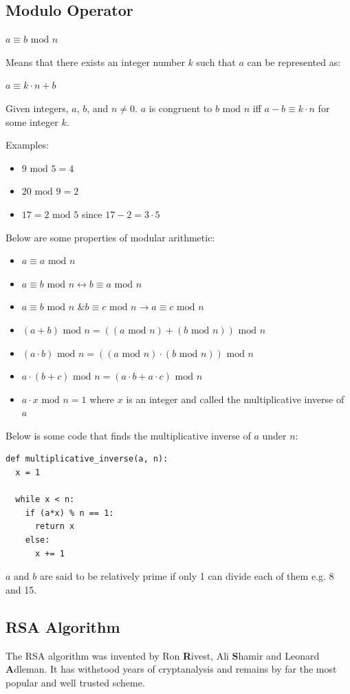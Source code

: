 \documentclass{article}
\newcommand{\Mod}[1]{\text{ mod }#1}
\begin{document}
\subsection{Modulo Operator}
\begin{center}
	$a \equiv b \Mod n$
\end{center}
Means that there exists an integer number $k$ such that $a$ can be represented as:
\begin{center}
	$a \equiv k \cdot n + b$
\end{center}
Given integers, $a$, $b$, and $n \neq 0$. $a$ is congruent to $b \Mod n$ iff $a-b \equiv k\cdot n$ for some integer $k$.

Examples:
\begin{itemize}
	\item $9 \Mod 5 = 4$
	\item $20 \Mod 9 = 2$
	\item $17 = 2 \Mod 5$ since $17-2 = 3 \cdot 5$
\end{itemize}
Below are some properties of modular arithmetic:
\begin{itemize}
	\item $a \equiv a \Mod n$
	\item $a \equiv b \Mod n \leftrightarrow b \equiv a \Mod n$
	\item $a \equiv b \Mod n \text{ \& } b \equiv c \Mod n \rightarrow a \equiv c \Mod n$
	\item $(a + b) \Mod n = ((a \Mod n) + (b \Mod n)) \Mod n$
	\item $(a \cdot b) \Mod n = ((a \Mod n) \cdot (b \Mod n)) \Mod n$
	\item $a \cdot (b + c) \Mod n = (a \cdot b + a \cdot c) \Mod n$
	\item $a \cdot x \Mod n = 1$ where $x$ is an integer and called the multiplicative inverse of $a$
\end{itemize}
Below is some code that finds the multiplicative inverse of $a$ under $n$:
\begin{lstlisting}
def multiplicative_inverse(a, n):
  x = 1

  while x < n:
    if (a*x) % n == 1:
      return x
    else:
      x += 1
\end{lstlisting}
$a$ and $b$ are said to be relatively prime if only 1 can divide each of them e.g. 8 and 15.
\subsection{RSA Algorithm}
The RSA algorithm was invented by Ron \textbf{R}ivest, Ali \textbf{S}hamir and Leonard \textbf{A}dleman. It has withstood years of cryptanalysis and remains by far the most popular and well trusted scheme.
\end{document}
